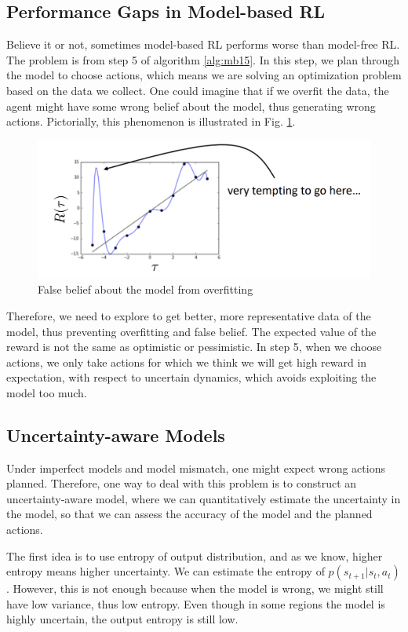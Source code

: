 \subsection{Performance Gaps in Model-based RL}
Believe it or not, sometimes model-based RL performs worse than model-free RL. The problem is from step 5 of algorithm \ref{alg:mb15}. In this step, we plan through the model to choose actions, which means we are solving an optimization problem based on the data we collect. One could imagine that if we overfit the data, the agent might have some wrong belief about the model, thus generating wrong actions. Pictorially, this phenomenon is illustrated in Fig. \ref{fig:overfit}.
\begin{figure}
    \centering
    \includegraphics[scale=0.5]{figures/overfit.png}
    \caption{False belief about the model from overfitting}
    \label{fig:overfit}
\end{figure}

Therefore, we need to explore to get better, more representative data of the model, thus preventing overfitting and false belief. The expected value of the reward is not the same as optimistic or pessimistic. In step 5, when we choose actions, we only take actions for which we think we will get high reward in expectation, with respect to uncertain dynamics, which avoids exploiting the model too much.

\subsection{Uncertainty-aware Models}
Under imperfect models and model mismatch, one might expect wrong actions planned. Therefore, one way to deal with this problem is to construct an uncertainty-aware model, where we can quantitatively estimate the uncertainty in the model, so that we can assess the accuracy of the model and the planned actions. 

The first idea is to use entropy of output distribution, and as we know, higher entropy means higher uncertainty. We can estimate the entropy of $p(s_{t+1}|s_t,a_t)$. However, this is not enough because when the model is wrong, we might still have low variance, thus low entropy. Even though in some regions the model is highly uncertain, the output entropy is still low.

